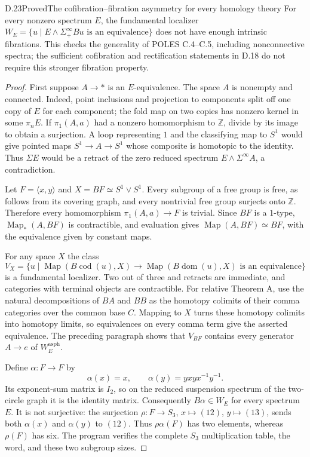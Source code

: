 \begin{result}{D.23}{Proved}{The cofibration--fibration asymmetry for every homology theory}
For every nonzero spectrum $E$, the fundamental localizer
$W_E=\{u\mid E\wedge\Sigma^\infty_+Bu\text{ is an equivalence}\}$
does not have enough intrinsic fibrations. This checks the
generality of POLES C.4--C.5, including nonconnective spectra;
the sufficient cofibration and rectification statements in D.18
do not require this stronger fibration property.
\end{result}
\begin{proof}
First suppose $A\to *$ is an $E$-equivalence. The space $A$ is
nonempty and connected. Indeed, point inclusions and projection
to components split off one copy of $E$ for each component;
the fold map on two copies has nonzero kernel in some $\pi_n E$.
If $\pi_1(A,a)$ had a nonzero homomorphism to $\mathbb Z$,
divide by its image to obtain a surjection. A loop representing
$1$ and the classifying map to $S^1$ would give pointed maps
$S^1\to A\to S^1$ whose composite is homotopic to the identity.
Thus $\Sigma E$ would be a retract of the zero reduced spectrum
$E\wedge\Sigma^\infty A$, a contradiction.

Let $F=\langle x,y\rangle$ and $X=BF\simeq S^1\vee S^1$.
Every subgroup of a free group is free, as follows from its
covering graph, and every nontrivial free group surjects onto
$\mathbb Z$. Therefore every homomorphism $\pi_1(A,a)\to F$
is trivial. Since $BF$ is a $1$-type,
$\operatorname{Map}_*(A,BF)$ is contractible, and evaluation gives
$\operatorname{Map}(A,BF)\simeq BF$, with the equivalence given
by constant maps.

For any space $X$ the class
\[
 V_X=\{u\mid\operatorname{Map}(B\operatorname{cod}(u),X)
              \to\operatorname{Map}(B\operatorname{dom}(u),X)
                 \text{ is an equivalence}\}
\]
is a fundamental localizer. Two out of three and retracts are
immediate, and categories with terminal objects are contractible.
For relative Theorem A, use the natural decompositions of $BA$
and $BB$ as the homotopy colimits of their comma categories over
the common base $C$. Mapping to $X$ turns these homotopy colimits
into homotopy limits, so equivalences on every comma term give
the asserted equivalence. The preceding paragraph shows that
$V_{BF}$ contains every generator $A\to e$ of
$W_E^{\mathrm{asph}}$.

Define $\alpha:F\to F$ by
\[
 \alpha(x)=x,\qquad \alpha(y)=yxyx^{-1}y^{-1}.
\]
Its exponent-sum matrix is $I_2$, so on the reduced suspension
spectrum of the two-circle graph it is the identity matrix.
Consequently $B\alpha\in W_E$ for every spectrum $E$.
It is not surjective: the surjection
$\rho:F\to S_3$, $x\mapsto(12)$, $y\mapsto(13)$, sends both
$\alpha(x)$ and $\alpha(y)$ to $(12)$. Thus
$\rho\alpha(F)$ has two elements, whereas $\rho(F)$ has six.
The program verifies the complete $S_3$ multiplication table,
the word, and these two subgroup sizes.


\end{proof}
